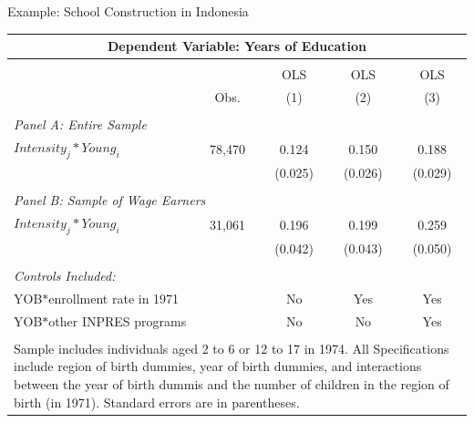 \documentclass[10pt,xcolor=table,ignorenonframetext,aspectratio=169]{beamer}
\begin{document}

\begin{frame}{Example:  School Construction in Indonesia}

\medskip
\begin{center}
\begin{footnotesize}
	\begin{tabular}{lcccc}
		\multicolumn{5}{c}{\textbf{Dependent Variable:  Years of Education}} \\ [0.6ex]
		\hline \hline
		& & & & \\ [-2.2ex]
		&         & OLS   & OLS & OLS \\ [0.6ex]
		& Obs.     & (1)   & (2) & (3) \\ [0.6ex]
		\hline
		& & & & \\ [-2.2ex]
		\multicolumn{5}{l}{\textit{Panel A:  Entire Sample}} \\ [0.6ex]
		$Intensity_j * Young_i$ & 78,470    &  0.124    & 0.150 & 0.188 \\ [0.6ex]
		&           & (0.025)   & (0.026)   & (0.029) \\ [0.6ex]
		\hline
		& & & & \\ [-2.2ex]
		\multicolumn{5}{l}{\textit{Panel B:  Sample of Wage Earners}} \\ [0.6ex]
		$Intensity_j * Young_i$ & 31,061    &  0.196    & 0.199 & 0.259 \\ [0.6ex]
		&           & (0.042)   & (0.043)   & (0.050) \\ [0.6ex]
		\hline
		& & & & \\ [-2.2ex]
		\multicolumn{5}{l}{\textit{Controls Included:}} \\ [0.6ex]
		YOB$*$enrollment rate in 1971   &  & No & Yes & Yes \\ [0.6ex]
		YOB$*$other INPRES programs   &  & No & No & Yes \\ [0.6ex]
		\hline
		& & & & \\ [-2.2ex]
		\multicolumn{5}{p{9.4cm}}{\scriptsize{Sample includes individuals aged 2 to 6 or 12 to 17 in 1974.  All Specifications include region of birth dummies, year of birth dummies, and interactions between the year of birth dummis and the number of children in the region of birth (in 1971).  Standard errors are in parentheses.}}
	\end{tabular}
\end{footnotesize}
\end{center}

\end{frame}
\end{document}
